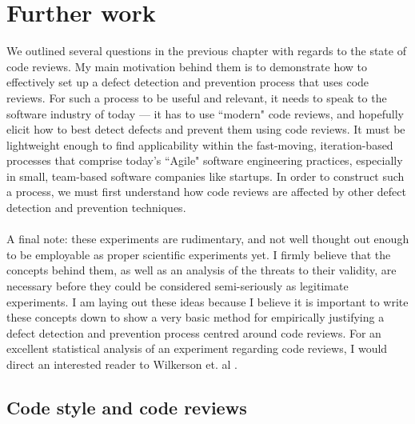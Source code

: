 \chapter{Further work} \label{chapter:experiment}

We outlined several questions in the previous chapter with regards to the state of code reviews.
My main motivation behind them is to demonstrate how to effectively set up a defect detection and prevention
process that uses code reviews.
For such a process to be useful and relevant, it needs to speak to the software industry of today
--- it has to use ``modern" code reviews, and hopefully elicit how to best detect defects and
prevent them using code reviews.
It must be lightweight enough to find applicability within the fast-moving, iteration-based
processes that comprise today's ``Agile" software engineering practices, especially in small,
team-based software companies like startups.
In order to construct such a process, we must first understand how code reviews are affected by
other defect detection and prevention techniques.\\
\\
A final note: these experiments are rudimentary, and not well thought out enough to be employable as
proper scientific experiments yet.
I firmly believe that the concepts behind them, as well as an analysis of the threats to their
validity, are necessary before they could be considered semi-seriously as legitimate experiments.
I am laying out these ideas because I believe it is important to write these concepts down to show a
very basic method for empirically justifying a defect detection and prevention process centred
around code reviews.
For an excellent statistical analysis of an experiment regarding code reviews, I would direct an
interested reader to Wilkerson et. al \cite{wilkerson2012comparing}.

\section{Code style and code reviews} \label{section:exp:codeStyle}


